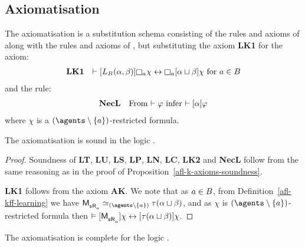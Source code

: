 \subsection{Axiomatisation}

\begin{definition}\label{afl-kff-axioms}
The axiomatisation \axiomAflKFF{} is a substitution schema consisting of the rules and axioms of \axiomKFF{} along with the rules and axioms of \axiomAflK{}, but substituting the \axiomAflK{} axiom {\bf LK1} for the axiom:
$$
\begin{array}{rl}
    {\bf LK1} & \proves \actionA{\learnsBs (\alpha, \beta)} \necessaryA \chi \iff \necessaryA \actionA{\alpha \choice \beta} \chi \text{ for } \agentA \in \agentsB\\
\end{array}
$$
and the rule:
$$
\begin{array}{rl}
    {\bf NecL} & \text{From $\vdash \varphi$ infer $\vdash {[ {\alpha} ]} \varphi$}
\end{array}
$$
where $\chi$ is a $(\agents \setminus \{\agentA\})$-restricted formula.
\end{definition}

\begin{proposition}\label{afl-kff-axioms-soundness}
The axiomatisation \axiomAflKFF{} is sound in the logic \logicAmlKFF{}.
\end{proposition}

\begin{proof}
Soundness of {\bf LT}, {\bf LU}, {\bf LS}, {\bf LP}, {\bf LN}, {\bf LC}, {\bf LK2} and {\bf NecL} follow from the same reasoning as in the proof of Proposition~\ref{afl-k-axioms-soundness}.

{\bf LK1} follows from the \axiomAmlKFF{} axiom {\bf AK}.
We note that as $a \in B$, from Definition~\ref{afl-kff-learning} we have $\aPModel{\aStateS \aAccessibility{\agentA}} \bisimilar[(\agents \setminus \{\agentA\})] \tau(\alpha \choice \beta)$, and as $\chi$ is $(\agents \setminus \{\agentA\})$-restricted formula then $\entails \actionA{\aPModel{\aStateS \aAccessibility{\agentA}}} \chi \iff \actionA{\tau(\alpha \choice \beta)} \chi$.
\end{proof}

\begin{proposition}\label{afl-kff-axioms-completeness}
The axiomatisation \axiomAflKFF{} is complete for the logic \logicAmlKFF{}.
\end{proposition}

